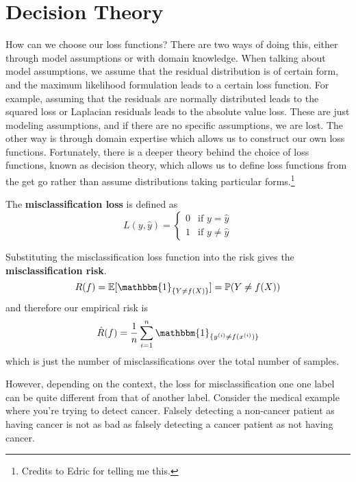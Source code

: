 \section{Decision Theory}

  How can we choose our loss functions? There are two ways of doing this, either through model assumptions or with domain knowledge. When talking about model assumptions, we assume that the residual distribution is of certain form, and the maximum likelihood formulation leads to a certain loss function. For example, assuming that the residuals are normally distributed leads to the squared loss or Laplacian residuals leads to the absolute value loss. These are just modeling assumptions, and if there are no specific assumptions, we are lost. The other way is through domain expertise which allows us to construct our own loss functions. Fortunately, there is a deeper theory behind the choice of loss functions, known as decision theory, which allows us to define loss functions from the get go rather than assume distributions taking particular forms.\footnote{Credits to Edric for telling me this.}

  \begin{definition}
    The \textbf{misclassification loss} is defined as 
    \begin{equation}
      L(y, \hat{y}) = \begin{cases} 0 & \text{if } y = \hat{y} \\ 1 & \text{if } y \neq \hat{y} \end{cases}
    \end{equation}
  \end{definition}

  \begin{example}
    Substituting the misclassification loss function into the risk gives the \textbf{misclassification risk}. 
    \begin{equation}
      R(f) = \mathbb{E} [\mathbbm{1}_{\{Y \neq f(X)\}}] = \mathbb{P}(Y \neq f(X)) 
    \end{equation}
    and therefore our empirical risk is 
    \begin{equation}
      \hat{R} (f) = \frac{1}{n} \sum_{i=1}^n \mathbbm{1}_{\{y^{(i)} \neq f(x^{(i)})\}}
    \end{equation}
    which is just the number of misclassifications over the total number of samples. 
  \end{example}

  However, depending on the context, the loss for misclassification one one label can be quite different from that of another label. Consider the medical example where you're trying to detect cancer. Falsely detecting a non-cancer patient as having cancer is not as bad as falsely detecting a cancer patient as not having cancer. 

